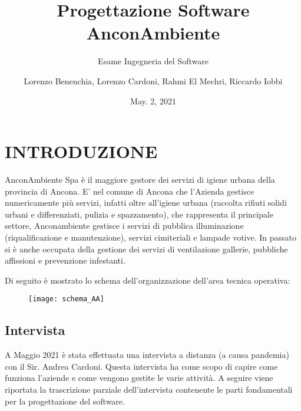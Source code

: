 \documentclass[green, fancy, 11pt]{elegantbook}
\title{Progettazione Software AnconAmbiente}
\subtitle{Esame Ingegneria del Software}
\author{Lorenzo Benenchia, Lorenzo Cardoni, Rahmi El Mechri, Riccardo Iobbi}
\institute{UNIVPM}
\date{May. 2, 2021}
\begin{document}
\maketitle
\frontmatter
\tableofcontents
\mainmatter

\chapter{INTRODUZIONE}
\noindent AnconAmbiente Spa è il maggiore gestore dei servizi di igiene urbana della provincia di Ancona.
\noindent E’ nel comune di Ancona che l’Azienda gestisce numericamente più servizi, infatti oltre all’igiene urbana (raccolta rifiuti solidi urbani e differenziati, pulizia e spazzamento), che rappresenta il principale settore, Anconambiente gestisce i servizi di pubblica illuminazione (riqualificazione e manutenzione), servizi cimiteriali e lampade votive. In passato si è anche occupata della gestione dei servizi di ventilazione gallerie, 
pubbliche affissioni e prevenzione infestanti.

\noindent Di seguito è mostrato lo schema dell'organizzazione dell'area tecnica operativa:\\

\begin{figure}[H]
	\texttt{[image: schema\_AA]}\\
\end{figure}
\newpage

\section{Intervista}
A Maggio 2021 è stata effettuata una intervista a distanza (a causa pandemia) con il Sir. Andrea Cardoni.
Questa intervista ha come scopo di capire come funziona l'aziende e come vengono gestite le varie attività.
A seguire viene riportata la trascrizione parziale dell'intervista contenente le parti fondamentali per la progettazione del software.
\end{document}
